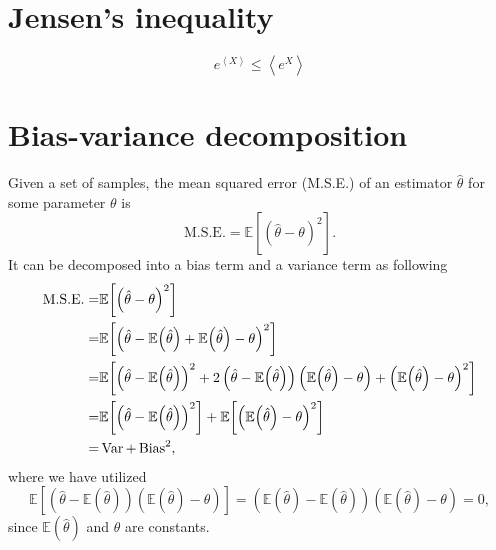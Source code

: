 \begin{appendices}
\chapter{Jensen's inequality\label{chapter:Appendix:JI}}
\begin{equation}
	e^{\left<X\right>}\leq \left<e^X\right>
\end{equation}


\chapter{Bias-variance decomposition\label{chapter:Appendix:BVD}}
Given a set of samples, the mean squared error (M.S.E.) of an estimator $\hat{\theta}$ for some parameter $\theta$ is
\begin{equation}
	\text{M.S.E.} = \mathbb{E}{\left[\left(\hat{\theta}-\theta\right)^2\right]}.
\end{equation}
It can be decomposed into a bias term and a variance term as following
\begin{align}
	\text{M.S.E.} =& \mathbb{E}{\left[\left(\hat{\theta}-\theta\right)^2\right]}\notag\\
	       =& \mathbb{E}{\left[\left(\hat{\theta}-\mathbb{E}{\left(\hat{\theta}\right)}+\mathbb{E}{\left(\hat{\theta}\right)}-\theta\right)^2\right]}\notag\\
	       =& \mathbb{E}{\left[ \left(\hat{\theta}-\mathbb{E}{\left(\hat{\theta}\right)}\right)^2+ 2\left(\hat{\theta}-\mathbb{E}{\left(\hat{\theta}\right)}\right)\left(\mathbb{E}{\left(\hat{\theta}\right)}-\theta\right)  +\left(\mathbb{E}{\left(\hat{\theta}\right)}-\theta\right)^2\right]}\notag\\
	       =&\mathbb{E}{\left[ \left(\hat{\theta}-\mathbb{E}{\left(\hat{\theta}\right)}\right)^2\right]}+\mathbb{E}{\left[\left(\mathbb{E}{\left(\hat{\theta}\right)}-\theta\right)^2\right]}\notag\\
	       =& \operatorname{Var}+\operatorname{Bias}^2,
\end{align}
where we have utilized 
\begin{equation}
	\mathbb{E}{\left[\left(\hat{\theta}-\mathbb{E}{\left(\hat{\theta}\right)}\right)\left(\mathbb{E}{\left(\hat{\theta}\right)}-\theta\right)\right]}=\left(\mathbb{E}\left(\hat{\theta}\right)-\mathbb{E}{\left(\hat{\theta}\right)}\right)\left(\mathbb{E}{\left(\hat{\theta}\right)}-\theta\right)=0,
\end{equation}
since $\mathbb{E}(\hat{\theta})$ and $\theta$ are constants.

\end{appendices}
